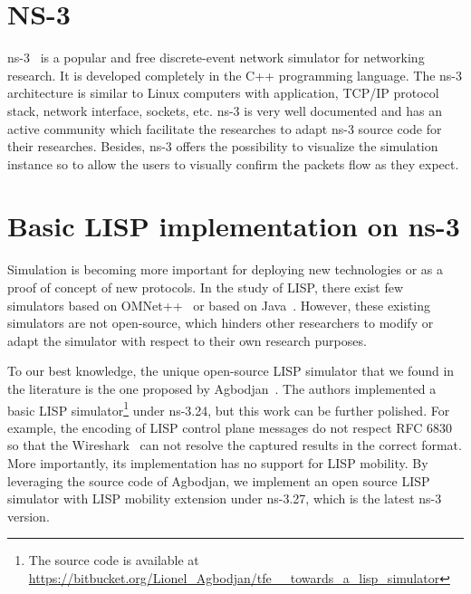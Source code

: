 \section{NS-3}
\label{sec:ns3_ns3}
ns-3~\cite{ns3} is a popular and free discrete-event network simulator for networking research. It is developed completely in the C++ programming language. %
The ns-3 architecture is similar to Linux computers with application, TCP/IP protocol stack, network interface, sockets, etc. ns-3 is very well documented and has an active community which facilitate the researches to adapt ns-3 source code for their researches.  Besides, ns-3 offers the possibility to visualize the simulation instance so to allow the users to visually confirm the packets flow as they expect. 

\section{Basic LISP implementation on ns-3}
\label{sec:ns3_basic_lisp}
Simulation is becoming more important for deploying new technologies or as a proof of concept of new protocols. In the study of LISP, there exist few simulators based on OMNet++~\cite{vesely2015locator, vesely2014multicast, klein2012integration} or based on Java~\cite{stockmayer2016jlisp}. However, these existing simulators are not open-source, which hinders other researchers to modify or adapt the simulator with respect to their own research purposes.

To our best knowledge, the unique open-source LISP simulator that we found in the literature is the one proposed by Agbodjan~\cite{lionel2016}. The authors implemented a basic LISP simulator\footnote{The source code is available at \url{https://bitbucket.org/Lionel_Agbodjan/tfe__towards_a_lisp_simulator}} under ns-3.24, but this work can be further polished. For example, the encoding of LISP control plane messages do not respect RFC 6830~\cite{rfc6830} so that the Wireshark~\cite{wireshark} can not resolve the captured results in the correct format. %
More importantly, its implementation has no support for LISP mobility. %
By leveraging the source code of Agbodjan, we implement an open source LISP simulator with LISP mobility extension under ns-3.27, which is the latest ns-3 version. 

